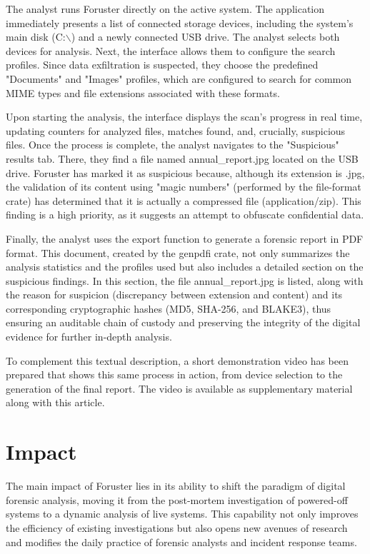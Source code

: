 \documentclass[preprint,12pt, a4paper]{elsarticle}
\begin{document}
The analyst runs Foruster directly on the active system. The application immediately presents a list of connected storage devices, including the system's main disk (C:$\backslash$) and a newly connected USB drive. The analyst selects both devices for analysis. Next, the interface allows them to configure the search profiles. Since data exfiltration is suspected, they choose the predefined "Documents" and "Images" profiles, which are configured to search for common MIME types and file extensions associated with these formats.

Upon starting the analysis, the interface displays the scan's progress in real time, updating counters for analyzed files, matches found, and, crucially, suspicious files. Once the process is complete, the analyst navigates to the "Suspicious" results tab. There, they find a file named annual\_report.jpg located on the USB drive. Foruster has marked it as suspicious because, although its extension is .jpg, the validation of its content using "magic numbers" (performed by the file-format crate) has determined that it is actually a compressed file (application/zip). This finding is a high priority, as it suggests an attempt to obfuscate confidential data.

Finally, the analyst uses the export function to generate a forensic report in PDF format. This document, created by the genpdfi crate, not only summarizes the analysis statistics and the profiles used but also includes a detailed section on the suspicious findings. In this section, the file annual\_report.jpg is listed, along with the reason for suspicion (discrepancy between extension and content) and its corresponding cryptographic hashes (MD5, SHA-256, and BLAKE3), thus ensuring an auditable chain of custody and preserving the integrity of the digital evidence for further in-depth analysis.


To complement this textual description, a short demonstration video has been prepared that shows this same process in action, from device selection to the generation of the final report. The video is available as supplementary material along with this article.

\section{Impact}
The main impact of Foruster lies in its ability to shift the paradigm of digital forensic analysis, moving it from the post-mortem investigation of powered-off systems to a dynamic analysis of live systems. This capability not only improves the efficiency of existing investigations but also opens new avenues of research and modifies the daily practice of forensic analysts and incident response teams.
\end{document}
